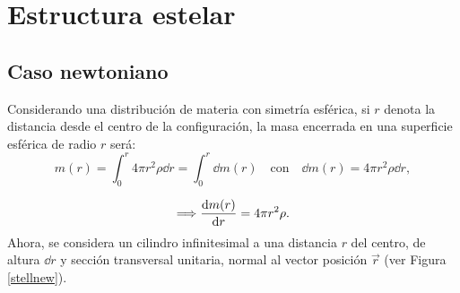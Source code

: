 \chapter{Estructura estelar}

\section{Caso newtoniano}

Considerando una distribución de materia con simetría esférica, si $r$ denota la distancia desde el centro de la configuración, la masa encerrada en una superficie esférica de radio $r$ será:  
\begin{equation}
    m ( r ) = \int _ { 0 } ^ { r } 4 \pi r ^ { 2 } \rho \dd{r} = \int_{0}^{r} \dd{m(r)} \quad\text{con}\quad \dd{m(r)}=4\pi r^2\rho \dd{r},
    \label{mN}
\end{equation}

\begin{equation}
    \Longrightarrow\dv{m(r)}{r} =4\pi r^2 \rho.
    \label{dmnewton}
\end{equation}
Ahora, se considera un cilindro infinitesimal a una distancia $r$ del centro, de altura $\dd{r}$ y sección transversal unitaria, normal al vector posición $\vec{r}$ (ver Figura \ref{stellnew}).  

